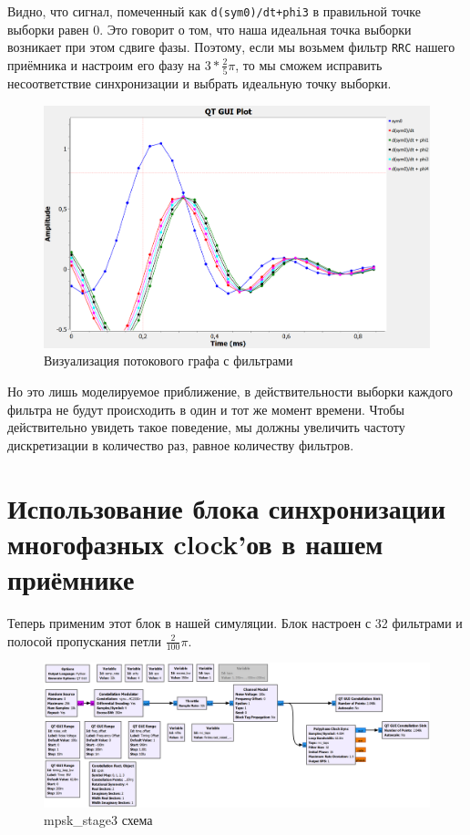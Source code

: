 \documentclass[a4paper,12pt]{report}
\begin{document}
Видно, что сигнал, помеченный как \texttt{d(sym0)/dt+phi3} в правильной точке выборки равен 0. Это говорит о том, что наша идеальная точка выборки возникает при этом сдвиге фазы. Поэтому, если мы возьмем фильтр \texttt{RRC} нашего приёмника и настроим его фазу на $3 * \frac{2}{5}\pi$, то мы сможем исправить несоответствие синхронизации и выбрать идеальную точку выборки.

\begin{figure}[H]
        \centering
        \includegraphics[width=1.0\textwidth]{15.png}
        \caption{Визуализация потокового графа с фильтрами}
        \label{fig:lab12_fig3_9}
\end{figure}

Но это лишь моделируемое приближение, в действительности выборки каждого фильтра не будут происходить в один и тот же момент времени. Чтобы действительно увидеть такое поведение, мы должны увеличить частоту дискретизации в количество раз, равное количеству фильтров.

\section{Использование блока синхронизации многофазных clock'ов в нашем приёмнике}

Теперь применим этот блок в нашей симуляции. Блок настроен с 32 фильтрами и полосой пропускания петли $\frac{2}{100}\pi$.

\begin{figure}[H]
        \centering
        \includegraphics[width=1.0\textwidth]{16.png}
        \caption{mpsk\_stage3 схема}
        \label{fig:lab12_fig3_10}
\end{figure}
\end{document}

